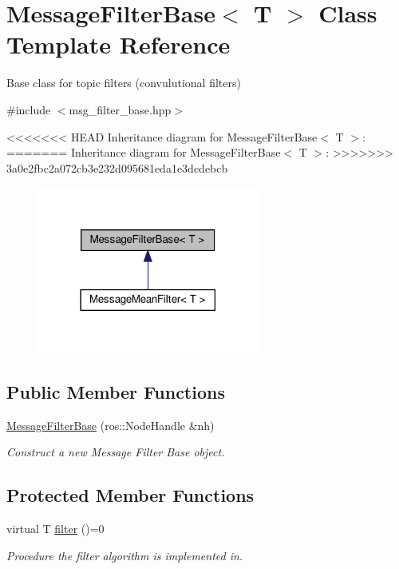 \hypertarget{classMessageFilterBase}{}\section{Message\+Filter\+Base$<$ T $>$ Class Template Reference}
\label{classMessageFilterBase}


Base class for topic filters (convulutional filters)  




{\ttfamily \#include $<$msg\+\_\+filter\+\_\+base.\+hpp$>$}



<<<<<<< HEAD
Inheritance diagram for Message\+Filter\+Base$<$ T $>$\+:\nopagebreak
=======
Inheritance diagram for Message\+Filter\+Base$<$ T $>$\+:
\nopagebreak
>>>>>>> 3a0e2fbc2a072cb3e232d095681eda1e3dcdebcb
\begin{figure}[H]
\begin{center}
\leavevmode
\includegraphics[width=206pt]{d3/d58/classMessageFilterBase__inherit__graph}
\end{center}
\end{figure}
\subsection*{Public Member Functions}
\begin{DoxyCompactItemize}
\item 
\hyperlink{classMessageFilterBase_aeb8e41a157fef0bcf63bd8061eea4b4a}{Message\+Filter\+Base} (ros\+::\+Node\+Handle \&nh)
\begin{DoxyCompactList}\small\item\em Construct a new Message Filter Base object. \end{DoxyCompactList}\end{DoxyCompactItemize}
\subsection*{Protected Member Functions}
\begin{DoxyCompactItemize}
\item 
virtual T \hyperlink{classMessageFilterBase_a9ddc835d7366cacf63ba4a4e42839f6b}{filter} ()=0
\begin{DoxyCompactList}\small\item\em Procedure the filter algorithm is implemented in. \end{DoxyCompactList}\end{DoxyCompactItemize}
